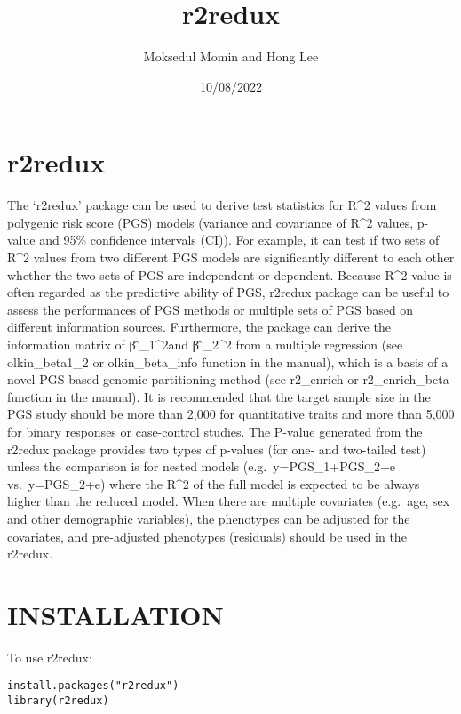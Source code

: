 \documentclass[
]{article}
\title{r2redux}
\author{Moksedul Momin and Hong Lee}
\date{10/08/2022}
\begin{document}
\maketitle

\hypertarget{r2redux}{%
\section{r2redux}\label{r2redux}}

The `r2redux' package can be used to derive test statistics for R\^{}2
values from polygenic risk score (PGS) models (variance and covariance
of R\^{}2 values, p-value and 95\% confidence intervals (CI)). For
example, it can test if two sets of R\^{}2 values from two different PGS
models are significantly different to each other whether the two sets of
PGS are independent or dependent. Because R\^{}2 value is often regarded
as the predictive ability of PGS, r2redux package can be useful to
assess the performances of PGS methods or multiple sets of PGS based on
different information sources. Furthermore, the package can derive the
information matrix of β ̂\_1\^{}2and β ̂\_2\^{}2 from a multiple
regression (see olkin\_beta1\_2 or olkin\_beta\_info function in the
manual), which is a basis of a novel PGS-based genomic partitioning
method (see r2\_enrich or r2\_enrich\_beta function in the manual). It
is recommended that the target sample size in the PGS study should be
more than 2,000 for quantitative traits and more than 5,000 for binary
responses or case-control studies. The P-value generated from the
r2redux package provides two types of p-values (for one- and two-tailed
test) unless the comparison is for nested models (e.g.~y=PGS\_1+PGS\_2+e
vs.~y=PGS\_2+e) where the R\^{}2 of the full model is expected to be
always higher than the reduced model. When there are multiple covariates
(e.g.~age, sex and other demographic variables), the phenotypes can be
adjusted for the covariates, and pre-adjusted phenotypes (residuals)
should be used in the r2redux.

\hypertarget{installation}{%
\section{INSTALLATION}\label{installation}}

To use r2redux:

\begin{verbatim}
install.packages("r2redux") 
library(r2redux)
\end{verbatim}
\end{document}
